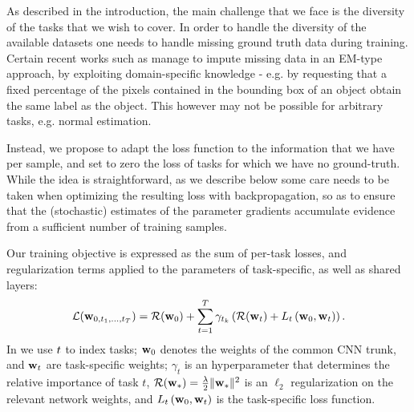 \documentclass[10pt,twocolumn,letterpaper]{article}
\begin{document}
 



As described in the introduction, the main challenge that we face is the diversity of the tasks that we wish to cover. 
In order to handle the diversity of the available datasets one needs to handle  missing ground truth data during training. Certain recent works such as \cite{papa15,OquabBLS15,dai2015boxsup} manage to impute missing data in an EM-type approach, by exploiting domain-specific knowledge - e.g. by requesting that a fixed percentage of the pixels contained in the  bounding box of an object obtain the same label as the object. This however may not be possible for arbitrary tasks, e.g. normal estimation. 

Instead, we propose to adapt the loss function to the information that we have per sample, and set to zero the loss of tasks for which we have no ground-truth. While the idea is straightforward, as we describe below some care needs to be taken when optimizing the resulting loss with backpropagation, so as to ensure that the (stochastic) estimates of the parameter gradients accumulate evidence from a sufficient number of training samples.  


Our training objective is expressed as the sum of per-task losses, and regularization terms applied to the parameters of task-specific, as well as shared layers:
\begin{gather}
\mathcal{L}(\mathbf{w}_{0,t_1,\ldots,t_T}) = \mathcal{R}(\mathbf{w}_{0}) + \sum_{t=1}^T  \gamma_{t_k} \left(\mathcal{R}(\mathbf{w}_{t})  +  L_{t}\left(\mathbf{w}_{0},\mathbf{w}_{t}\right)\right).
\label{eq:objective}
\end{gather}
In  we use $t$ to index tasks; $\mathbf{w}_{0}$ denotes the weights of the common CNN trunk,  and $\mathbf{w}_{{t}}$ are task-specific weights; $\gamma_t$ is an hyperparameter that determines the relative importance of task $t$,
 $\mathcal{R}(\mathbf{w}_{\mathrm{\ast}}) =  \frac{\lambda}{2}\|\mathbf{w}_{\mathrm{\ast}}\|^2$ is an $\ell_2$ regularization on the relevant network weights, and $L_{t}\left(\mathbf{w}_{0},\mathbf{w}_{t}\right)$ is the task-specific loss function.
\end{document}
